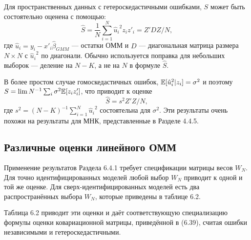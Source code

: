 Для пространственных данных с гетероскедастичными ошибками, $S$ может быть состоятельно оценена с помощью:
\begin{equation}
\hat{S}=\frac{1}{N} \sum_{i=1}^{N} {\hat{u}_i}^2 z_i z'_i =Z'DZ/N,
\end{equation}
где $\hat{u}_i=y_i-x'_i \hat{\beta}_{GMM}$ --- остатки ОММ и $D$ --- диагональная матрица размера $N \times N$ с ${\hat{u}_i}^2$ по диагонали. Обычно используется поправка для небольших выборок --- деление на $N-K$, а не на $N$ в формуле $\hat{S}$.

В более простом случае гомоскедастичных ошибок, $\mathbb{E}[{\hat{u}_i}^2|z_i]={\sigma}^2$ и поэтому $S=\lim N^{-1} \sum_i {\sigma}^2 \mathbb{E}[z_i z'_i]$, что приводит к оценке
\begin{equation}
\hat{S}=s^2 Z'Z/N,
\end{equation}
где $s^2=(N-K)^{-1} \sum_{i=1}^{N} {\hat{u}_i}^2$ состоятельна для ${\sigma}^2$. Эти результаты очень похожи на результаты для МНК, представленные в Разделе 4.4.5.

\subsection{Различные оценки линейного ОММ}

Применение результатов Раздела 6.4.1 требует спецификации матрицы весов $W_N$. Для точно идентифицированных моделей любой выбор $W_N$ приводит к одной и той же оценке. Для сверх-идентифицированных моделей есть два распространённых выбора $W_N$, которые приведены в таблице 6.2.

Таблица 6.2 приводит эти оценки и даёт соответствующую специализацию формулы оценки ковариационной матрицы, приведённой в (6.39), считая ошибки независимыми и гетероскедастичными.

